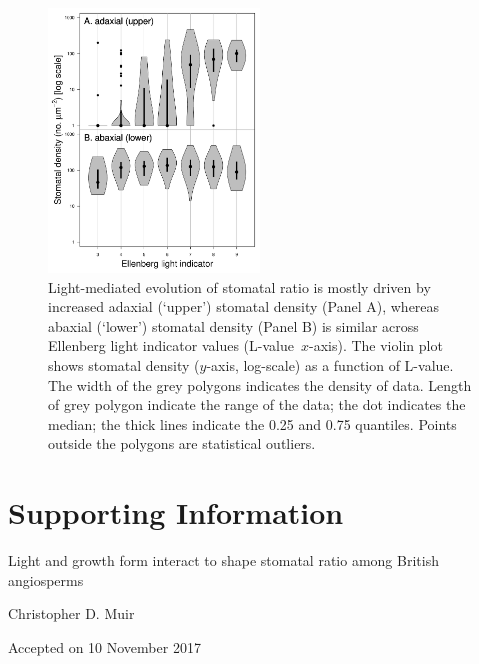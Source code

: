 \documentclass[12pt, oneside]{article}
\newcommand{\el}{L-value}
\begin{document}
\begin{figure}[ht]
\centerline{\includegraphics[width=0.5\textwidth]{figures/figure_SD-light.pdf}}
\caption{Light-mediated evolution of stomatal ratio is mostly driven by increased adaxial (`upper') stomatal density (Panel A), whereas abaxial (`lower') stomatal density (Panel B) is similar across Ellenberg light indicator values (\el~$x$-axis). The violin plot shows stomatal density ($y$-axis, log-scale) as a function of \el. The width of the grey polygons indicates the density of data. Length of grey polygon indicate the range of the data; the dot indicates the median; the thick lines indicate the 0.25 and 0.75 quantiles. Points outside the polygons are statistical outliers.} 
\label{fig:SD-light}
\end{figure}

\clearpage


\section*{Supporting Information}

\begin{center}
{\Huge Light and growth form interact to shape stomatal ratio among British angiosperms}

{\large Christopher D. Muir}

{\large Accepted on 10 November 2017}

\end{center}

\clearpage

\renewcommand\thefigure{S\arabic{figure}}    
\renewcommand\thetable{S\arabic{table}}    
\renewcommand\theequation{S\arabic{equation}}    
\setcounter{table}{0}    
\setcounter{equation}{0}
\setcounter{figure}{0}
\end{document}

